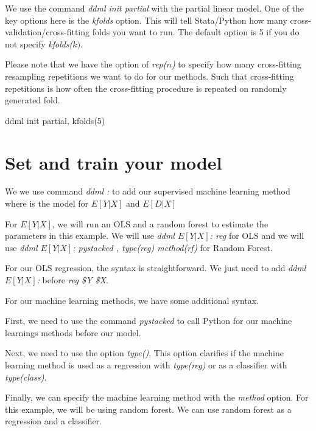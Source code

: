 \documentclass[
]{book}
\newenvironment{Shaded}{\begin{snugshade}}{\end{snugshade}}
\newcommand{\DecValTok}[1]{\textcolor[rgb]{0.00,0.00,0.81}{#1}}
\newcommand{\KeywordTok}[1]{\textcolor[rgb]{0.13,0.29,0.53}{\textbf{#1}}}
\newcommand{\NormalTok}[1]{#1}
\newcommand{\OtherTok}[1]{\textcolor[rgb]{0.56,0.35,0.01}{#1}}
\begin{document}
We use the command \emph{ddml init partial} with the partial linear model. One of the key options here is the \emph{kfolds} option. This will tell Stata/Python how many cross-validation/cross-fitting folds you want to run. The default option is 5 if you do not specify \emph{kfolds(\(k)\)}.

Please note that we have the option of \emph{rep(\(n\))} to specify how many cross-fitting resampling repetitions we want to do for our methods. Such that cross-fitting repetitions is how often the cross-fitting procedure is repeated on randomly generated fold.

\begin{Shaded}
\begin{Highlighting}[]
\NormalTok{ddml init partial, kfolds(5)}
\end{Highlighting}
\end{Shaded}

\section{Set and train your model}\label{set-and-train-your-model}

We we use command \emph{ddml : } to add our supervised machine learning method where is the model for \(E[Y|X]\) and \(E[D|X]\)

For \(E[Y|X]\), we will run an OLS and a random forest to estimate the parameters in this example.
We will use \emph{ddml \(E[Y|X]\): reg} for OLS and we will use \emph{ddml \(E[Y|X]\): pystacked , type(reg) method(rf)} for Random Forest.

For our OLS regression, the syntax is straightforward. We just need to add \emph{ddml \(E[Y|X]\):} before \emph{reg \$Y \$X}.

For our machine learning methods, we have some additional syntax.

First, we need to use the command \emph{pystacked} to call Python for our machine learnings methods before our model.

Next, we need to use the option \emph{type()}. This option clarifies if the machine learning method is used as a regression with \emph{type(reg)} or as a classifier with \emph{type(class)}.

Finally, we can specify the machine learning method with the \emph{method} option. For this example, we will be using random forest. We can use random forest as a regression and a classifier.

\begin{Shaded}
\end{Shaded}
\end{document}
